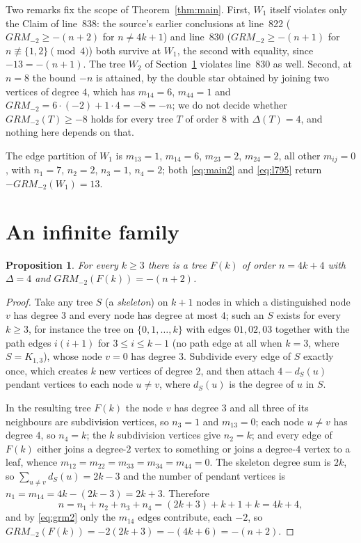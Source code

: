 \documentclass[11pt]{amsart}
\newtheorem{proposition}[theorem]{Proposition}
\begin{document}
Two remarks fix the scope of Theorem~\ref{thm:main}. First, $W_1$ itself violates only the
Claim of line~838: the source's earlier conclusions at line~822 ($GRM_{-2}\ge-(n+2)$ for
$n\ne 4k+1$) and line~830 ($GRM_{-2}\ge-(n+1)$ for $n\not\equiv\{1,2\}\pmod 4$) both survive
at $W_1$, the second with equality, since $-13=-(n+1)$. The tree $W_2$ of
Section~\ref{sec:family} violates line~830 as well. Second, at $n=8$ the bound $-n$ is
attained, by the double star obtained by joining two vertices of degree $4$, which has
$m_{14}=6$, $m_{44}=1$ and $GRM_{-2}=6\cdot(-2)+1\cdot 4=-8=-n$; we do not decide whether
$GRM_{-2}(T)\ge-8$ holds for every tree $T$ of order $8$ with $\Delta(T)=4$, and nothing here
depends on that.

The edge partition of $W_1$ is $m_{13}=1$, $m_{14}=6$, $m_{23}=2$, $m_{24}=2$, all other
$m_{ij}=0$, with $n_1=7$, $n_2=2$, $n_3=1$, $n_4=2$; both \eqref{eq:main2} and
\eqref{eq:l795} return $-GRM_{-2}(W_1)=13$.

\section{An infinite family}\label{sec:family}

\begin{proposition}\label{prop:family}
For every $k\ge 3$ there is a tree $F(k)$ of order $n=4k+4$ with $\Delta=4$ and
$GRM_{-2}(F(k))=-(n+2)$.
\end{proposition}

\begin{proof}
Take any tree $S$ (a \emph{skeleton}) on $k+1$ nodes in which a distinguished node $v$ has
degree $3$ and every node has degree at most $4$; such an $S$ exists for every $k\ge 3$, for
instance the tree on $\{0,1,\dots,k\}$ with edges $01,02,03$ together with the path edges
$i(i+1)$ for $3\le i\le k-1$ (no path edge at all when $k=3$, where $S=K_{1,3}$), whose
node $v=0$ has degree $3$. Subdivide every edge of $S$ exactly once, which creates $k$ new
vertices of degree $2$, and then attach $4-d_S(u)$ pendant vertices to each node $u\ne v$,
where $d_S(u)$ is the degree of $u$ in $S$.

In the resulting tree $F(k)$ the node $v$ has degree $3$ and all three of its neighbours are
subdivision vertices, so $n_3=1$ and $m_{13}=0$; each node $u\ne v$ has degree $4$, so
$n_4=k$; the $k$ subdivision vertices give $n_2=k$; and every edge of $F(k)$ either joins a
degree-$2$ vertex to something or joins a degree-$4$ vertex to a leaf, whence
$m_{12}=m_{22}=m_{33}=m_{34}=m_{44}=0$. The skeleton degree sum is $2k$, so
$\sum_{u\ne v}d_S(u)=2k-3$ and the number of pendant vertices is
$n_1=m_{14}=4k-(2k-3)=2k+3$. Therefore
\[
  n=n_1+n_2+n_3+n_4=(2k+3)+k+1+k=4k+4 ,
\]
and by \eqref{eq:grm2} only the $m_{14}$ edges contribute, each $-2$, so
$GRM_{-2}(F(k))=-2(2k+3)=-(4k+6)=-(n+2)$.
\end{proof}
\end{document}
